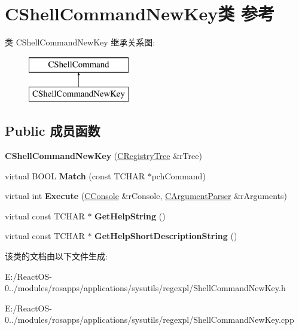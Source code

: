 \hypertarget{class_c_shell_command_new_key}{}\section{C\+Shell\+Command\+New\+Key类 参考}
\label{class_c_shell_command_new_key}
类 C\+Shell\+Command\+New\+Key 继承关系图\+:\begin{figure}[H]
\begin{center}
\leavevmode
\includegraphics[height=2.000000cm]{class_c_shell_command_new_key}
\end{center}
\end{figure}
\subsection*{Public 成员函数}
\begin{DoxyCompactItemize}
\item 
\mbox{\label{class_c_shell_command_new_key_ac4142732a24bb11c6376a049a84bd7b2}} 
{\bfseries C\+Shell\+Command\+New\+Key} (\hyperlink{class_c_registry_tree}{C\+Registry\+Tree} \&r\+Tree)
\item 
\mbox{\label{class_c_shell_command_new_key_a0fb1ded129c65a9c98d85695ebadcf3f}} 
virtual B\+O\+OL {\bfseries Match} (const T\+C\+H\+AR $\ast$pch\+Command)
\item 
\mbox{\label{class_c_shell_command_new_key_ae6c0ac582dd787023cf8bf7ac9989472}} 
virtual int {\bfseries Execute} (\hyperlink{class_c_console}{C\+Console} \&r\+Console, \hyperlink{class_c_argument_parser}{C\+Argument\+Parser} \&r\+Arguments)
\item 
\mbox{\label{class_c_shell_command_new_key_a71e93d7d464cf60425e6a19f9164ed6c}} 
virtual const T\+C\+H\+AR $\ast$ {\bfseries Get\+Help\+String} ()
\item 
\mbox{\label{class_c_shell_command_new_key_a09147527c7271c77ff938b8879c98187}} 
virtual const T\+C\+H\+AR $\ast$ {\bfseries Get\+Help\+Short\+Description\+String} ()
\end{DoxyCompactItemize}


该类的文档由以下文件生成\+:\begin{DoxyCompactItemize}
\item 
E\+:/\+React\+O\+S-\/0../modules/rosapps/applications/sysutils/regexpl/Shell\+Command\+New\+Key.\+h\item 
E\+:/\+React\+O\+S-\/0../modules/rosapps/applications/sysutils/regexpl/Shell\+Command\+New\+Key.\+cpp\end{DoxyCompactItemize}
